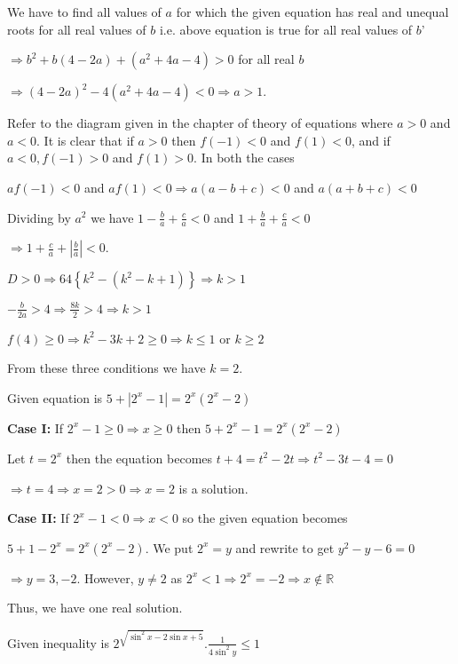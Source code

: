   We have to find all values of $a$ for which the given equation has real and unequal roots for all real
  values of $b$ i.e. above equation is true for all real values of $b$'

  $\Rightarrow b^2 + b(4 - 2a) + (a^2 + 4a - 4) > 0$ for all real $b$

  $\Rightarrow (4 - 2a)^2 - 4(a^2 + 4a - 4) < 0 \Rightarrow a > 1$.
\item Refer to the diagram given in the chapter of theory of equations where $a > 0$ and $a < 0$. It is
  clear that if $a > 0$ then $f(-1) < 0$ and $f(1) < 0$, and if $a < 0, f(-1) > 0$ and $f(1) > 0$. In both
  the cases

  $af(-1) < 0$ and $af(1) < 0\Rightarrow a(a - b + c) < 0$ and $a(a + b + c) < 0$

  Dividing by $a^2$ we have $1 - \frac{b}{a} + \frac{c}{a} < 0$ and $1 + \frac{b}{a} + \frac{c}{a} < 0$

  $\Rightarrow 1 + \frac{c}{a} + \left|\frac{b}{a}\right| < 0$.
\item $D > 0 \Rightarrow 64\left\{k^2 - (k^2 - k + 1)\right\}\Rightarrow k > 1$

  $-\frac{b}{2a} > 4\Rightarrow \frac{8k}{2} > 4\Rightarrow k > 1$

  $f(4)\geq 0 \Rightarrow k^2 -3k + 2 \geq 0 \Rightarrow k\leq 1$ or $k\geq 2$

  From these three conditions we have $k = 2$.
\item Given equation is $5 + \left|2^x - 1\right| = 2^x(2^x - 2)$

  {\bf Case I:} If $2^x - 1\geq 0\Rightarrow x\geq 0$ then $5 + 2^x - 1 = 2^x(2^x - 2)$

  Let $t = 2^x$ then the equation becomes $t + 4 = t^2 - 2t\Rightarrow t^2 - 3t - 4 = 0$

  $\Rightarrow t = 4 \Rightarrow x = 2 > 0\Rightarrow x = 2$ is a solution.

  {\bf Case II:} If $2^x - 1 < 0 \Rightarrow x < 0$ so the given equation becomes

  $5 + 1 - 2^x = 2^x\left(2^x - 2\right)$. We put $2^x = y$ and rewrite to get $y^2 - y - 6 = 0$

  $\Rightarrow y = 3, -2$. However, $y\neq 2$ as $2^x < 1\Rightarrow 2^x = -2 \Rightarrow
  x\not\in\mathbb{R}$

  Thus, we have one real solution.
\item Given inequality is $2^{\sqrt{\sin^2x - 2\sin x + 5}}.\frac{1}{4\sin^2y}\leq 1$

